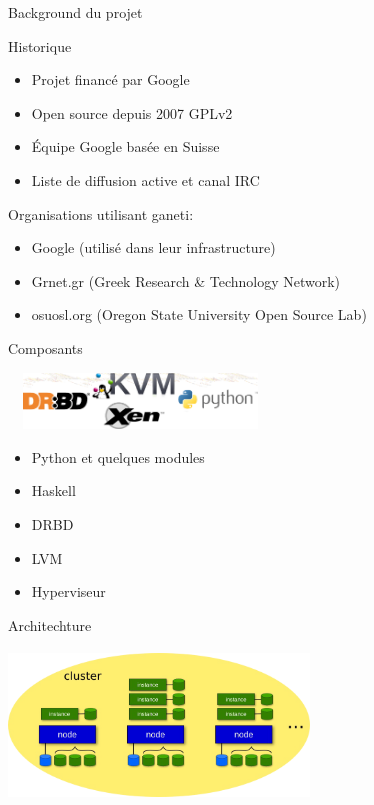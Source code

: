 \begin{frame}{Background du projet}
\begin{block}{Historique}
  \begin{itemize}
  \item Projet financé par Google

  \item Open source depuis 2007 GPLv2

  \item Équipe Google basée en Suisse

  \item Liste de diffusion active et canal IRC

  \end{itemize}
\end{block}
\begin{block}{Organisations utilisant ganeti:}
  \begin{itemize}
  \item Google (utilisé dans leur infrastructure)

  \item Grnet.gr (Greek Research \& Technology Network)

  \item osuosl.org (Oregon State University Open Source Lab)
  \end{itemize}
\end{block}
\end{frame}

\begin{frame}{Composants}
\begin{center}
  \includegraphics[width=7cm,height=1.5cm]{images_presentation/module.png}
\end{center}
\begin{itemize}
\item Python et quelques modules
\item Haskell
\item DRBD
\item LVM
\item Hyperviseur
\end{itemize}
\end{frame}

\begin{frame}{Architechture}
\begin{center}
  \includegraphics[width=8cm,height=4cm]{images_presentation/archi1.png}
\end{center}
\end{frame}

